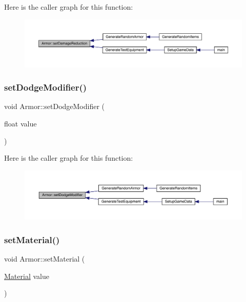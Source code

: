 Here is the caller graph for this function\+:
\nopagebreak
\begin{figure}[H]
\begin{center}
\leavevmode
\includegraphics[width=350pt]{d9/d76/class_armor_a08f926ae8438bae04058c22b098c6fcf_icgraph}
\end{center}
\end{figure}
\mbox{\label{class_armor_ab48309e3f16d226d56af617c65350698}} 
\subsubsection{\texorpdfstring{set\+Dodge\+Modifier()}{setDodgeModifier()}}
{\footnotesize\ttfamily void Armor\+::set\+Dodge\+Modifier (\begin{DoxyParamCaption}\item[{float}]{value }\end{DoxyParamCaption})}

Here is the caller graph for this function\+:
\nopagebreak
\begin{figure}[H]
\begin{center}
\leavevmode
\includegraphics[width=350pt]{d9/d76/class_armor_ab48309e3f16d226d56af617c65350698_icgraph}
\end{center}
\end{figure}
\mbox{\label{class_armor_a1710521cbba1bf9328e969cbbc8cdbf3}} 
\subsubsection{\texorpdfstring{set\+Material()}{setMaterial()}}
{\footnotesize\ttfamily void Armor\+::set\+Material (\begin{DoxyParamCaption}\item[{\mbox{\hyperlink{class_material}{Material}}}]{value }\end{DoxyParamCaption})}

